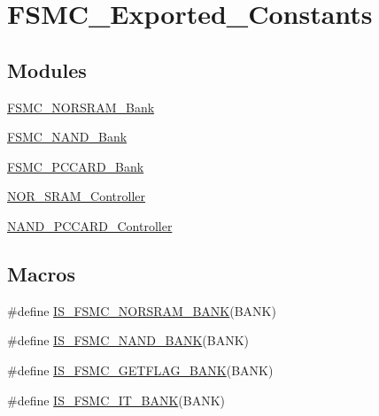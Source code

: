 \hypertarget{group___f_s_m_c___exported___constants}{}\section{F\+S\+M\+C\+\_\+\+Exported\+\_\+\+Constants}
\label{group___f_s_m_c___exported___constants}
\subsection*{Modules}
\begin{DoxyCompactItemize}
\item 
\mbox{\hyperlink{group___f_s_m_c___n_o_r_s_r_a_m___bank}{F\+S\+M\+C\+\_\+\+N\+O\+R\+S\+R\+A\+M\+\_\+\+Bank}}
\item 
\mbox{\hyperlink{group___f_s_m_c___n_a_n_d___bank}{F\+S\+M\+C\+\_\+\+N\+A\+N\+D\+\_\+\+Bank}}
\item 
\mbox{\hyperlink{group___f_s_m_c___p_c_c_a_r_d___bank}{F\+S\+M\+C\+\_\+\+P\+C\+C\+A\+R\+D\+\_\+\+Bank}}
\item 
\mbox{\hyperlink{group___n_o_r___s_r_a_m___controller}{N\+O\+R\+\_\+\+S\+R\+A\+M\+\_\+\+Controller}}
\item 
\mbox{\hyperlink{group___n_a_n_d___p_c_c_a_r_d___controller}{N\+A\+N\+D\+\_\+\+P\+C\+C\+A\+R\+D\+\_\+\+Controller}}
\end{DoxyCompactItemize}
\subsection*{Macros}
\begin{DoxyCompactItemize}
\item 
\#define \mbox{\hyperlink{group___f_s_m_c___exported___constants_ga3e3bed3dd83d38e63f11ac4cbcb87304}{I\+S\+\_\+\+F\+S\+M\+C\+\_\+\+N\+O\+R\+S\+R\+A\+M\+\_\+\+B\+A\+NK}}(B\+A\+NK)
\item 
\#define \mbox{\hyperlink{group___f_s_m_c___exported___constants_ga725bada099197f15f49dc0c5be00e19b}{I\+S\+\_\+\+F\+S\+M\+C\+\_\+\+N\+A\+N\+D\+\_\+\+B\+A\+NK}}(B\+A\+NK)
\item 
\#define \mbox{\hyperlink{group___f_s_m_c___exported___constants_ga884e28a365a738ad8a3199ee279a1f77}{I\+S\+\_\+\+F\+S\+M\+C\+\_\+\+G\+E\+T\+F\+L\+A\+G\+\_\+\+B\+A\+NK}}(B\+A\+NK)
\item 
\#define \mbox{\hyperlink{group___f_s_m_c___exported___constants_gaca216ea0c184b78f23df15296a10bac0}{I\+S\+\_\+\+F\+S\+M\+C\+\_\+\+I\+T\+\_\+\+B\+A\+NK}}(B\+A\+NK)
\end{DoxyCompactItemize}



